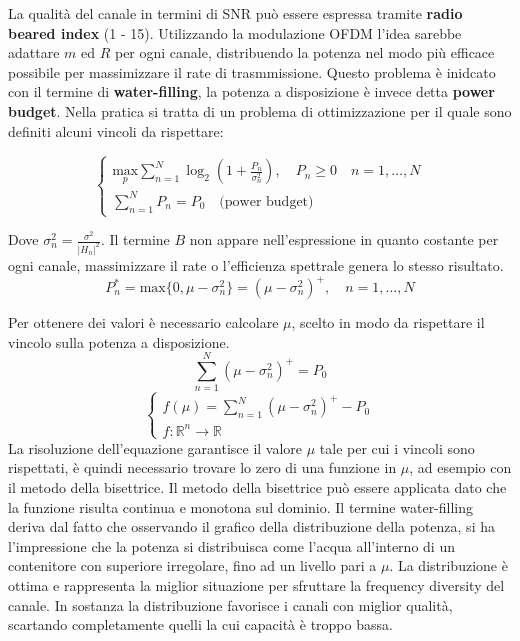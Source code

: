 La qualità del canale in termini di SNR può essere espressa tramite \textbf{radio beared index} (1 - 15).
Utilizzando la modulazione OFDM l'idea sarebbe adattare $m$ ed $R$ per ogni canale, distribuendo la potenza nel modo più efficace possibile per massimizzare il rate di trasmmissione. Questo problema è inidcato con il termine di \textbf{water-filling}, la potenza a disposizione è invece detta \textbf{power budget}. Nella pratica si tratta di un problema di ottimizzazione per il quale sono definiti alcuni vincoli da rispettare:


\[
    \begin{cases}
       \underset{p}{\text{max}} \sum_{n=1}^{N} \log_2(1 + \frac{P_n}{\sigma_n^2}), \quad P_n \geq 0 \quad n = 1, \ldots, N \\
       \sum_{n=1}^{N} P_n = P_0 \quad \text{(power budget)}
    \end{cases}    
\]

Dove $\sigma_n^2 = \frac{\sigma^2}{\left| H_n \right| ^2}$. Il termine $B$ non appare nell'espressione in quanto costante per ogni canale, massimizzare il rate o l'efficienza spettrale genera lo stesso risultato.
\[
    P_n^* = \text{max} \{ 0, \mu - \sigma_n^2    \} = (\mu - \sigma_n^2)^+, \quad n = 1, \ldots, N
\]

Per ottenere dei valori è necessario calcolare $\mu$, scelto in modo da rispettare il vincolo sulla potenza a disposizione.
\[
    \sum_{n=1}^{N} (\mu - \sigma_n^2)^+ = P_0
\]
\[
    \begin{cases}
        f(\mu) = \sum_{n=1}^{N} (\mu - \sigma_n^2)^+ - P_0 \\
        f: \mathbb{R}^n \rightarrow \mathbb{R}
    \end{cases}
\]
La risoluzione dell'equazione garantisce il valore $\mu$ tale per cui i vincoli sono rispettati, è quindi necessario trovare lo zero di una funzione in $\mu$, ad esempio con il metodo della bisettrice. Il metodo della bisettrice può essere applicata dato che la funzione risulta continua e monotona sul dominio.
Il termine water-filling deriva dal fatto che osservando il grafico della distribuzione della potenza, si ha l'impressione che la potenza si distribuisca come l'acqua all'interno di un contenitore con superiore irregolare, fino ad un livello pari a $\mu$.
La distribuzione è ottima e rappresenta la miglior situazione per sfruttare la frequency diversity del canale. In sostanza la distribuzione favorisce i canali con miglior qualità, scartando completamente quelli la cui capacità è troppo bassa.






